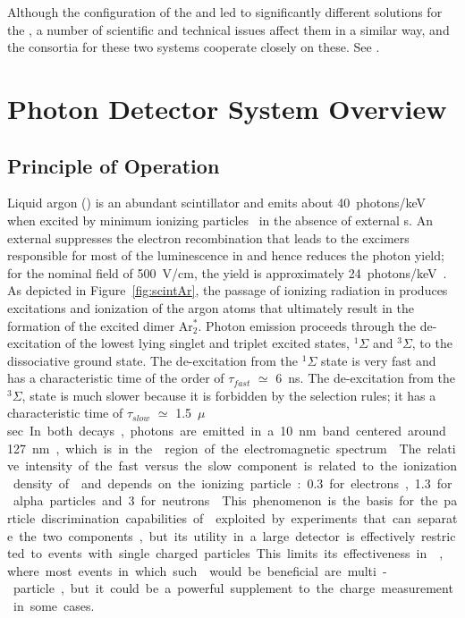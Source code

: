 Although the configuration of the  and  led to significantly different solutions for the , a number of scientific and technical issues affect them in a similar way, and the consortia for these two systems cooperate closely on these. See \dpchpds.



\section{Photon Detector System Overview}
\label{sec:fdsp-pd-overview}


\subsection{Principle of Operation}
Liquid argon () is  an abundant scintillator and emits about \SI{40}{photons/keV} when excited by minimum ionizing particles~\cite{Doke:1990rza} in the absence of external \efield{}s.
An external \efield{} suppresses the electron recombination that leads to the excimers responsible for most of the  luminescence in  and hence reduces the photon yield; for the nominal   field of \SI{500}{V/cm}, the yield is approximately \SI{24}{photons/keV}~\cite{PhysRevB.20.3486}. 
As depicted in Figure~\ref{fig:scintAr}, the passage of ionizing radiation in  produces excitations and ionization of the argon atoms that ultimately result in the formation of the excited dimer Ar$^*_2$.  
Photon emission proceeds through the de-excitation of the lowest lying singlet and triplet excited states, $^{1}\Sigma$ and 
$^{3}\Sigma$, to the dissociative ground state. The de-excitation from the $^{1}\Sigma$ state is very fast and has a characteristic time of the order of $\tau_{fast}$ $\simeq$ \SI{6}{ns}. The de-excitation from the $^{3}\Sigma$, state is much slower because it is forbidden by the selection rules; it has a characteristic time of $\tau_{slow}$ $\simeq$ \SI{1.5}{$\mu$sec}. %
In both decays, photons are emitted in a \SI{10}{nm} band centered around \SI{127}{nm}, which is in the  region of the electromagnetic spectrum~\cite{Heindl:2010zz}.
The relative intensity of the fast versus the slow component is related to the ionization density of  and depends on the ionizing particle: \num{0.3} for electrons, \num{1.3} for alpha particles and \num{3} for neutrons~\cite{PhysRevB.27.5279}. 
This phenomenon is the basis for the particle discrimination capabilities of  exploited by experiments that can separate the two components, but its utility in a large detector is effectively restricted to events with single charged particles. This %
limits its effectiveness in , where most events in which such  would be beneficial are multi-particle, but it could be a powerful supplement to the charge measurement in some cases.

